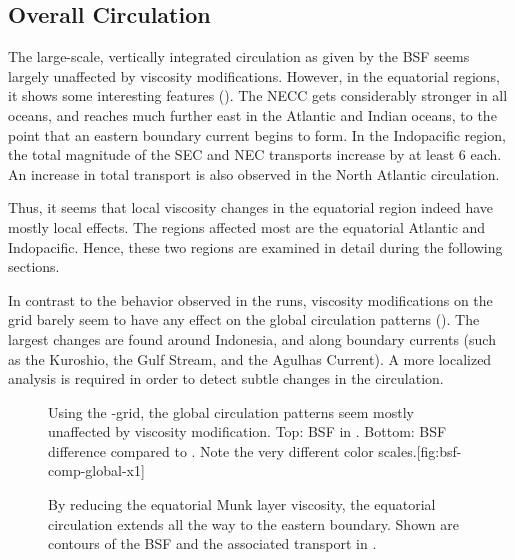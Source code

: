 \subsection{Overall Circulation}
\label{sec:obs-global}
The large-scale, vertically integrated circulation as given by the \ac{BSF} seems largely unaffected by viscosity modifications. However, in the equatorial regions, it shows some interesting features (). The \ac{NECC} gets considerably stronger in all oceans, and reaches much further east in the Atlantic and Indian oceans, to the point that an eastern boundary current begins to form. In the Indopacific region, the total magnitude of the \ac{SEC} and \ac{NEC} transports increase by at least \SI{6}{\sv} each. An increase in total transport is also observed in the North Atlantic circulation.

Thus, it seems that local viscosity changes in the equatorial region indeed have mostly local effects. The regions affected most are the equatorial Atlantic and Indopacific. Hence, these two regions are examined in detail during the following sections.

In contrast to the behavior observed in the  runs, viscosity modifications on the  grid barely seem to have any effect on the global circulation patterns (). The largest changes are found around Indonesia, and along boundary currents (such as the Kuroshio, the Gulf Stream, and the Agulhas Current). A more localized analysis is required in order to detect subtle changes in the circulation.

\begin{figure}[bp]
	\begin{sidecaption}{Using the -grid, the global circulation patterns seem mostly unaffected by viscosity modification. Top: \ac{BSF} in . Bottom: \ac{BSF} difference compared to . Note the very different color scales.}[fig:bsf-comp-global-x1]
		\antimpjustification
	\end{sidecaption}
\end{figure}

\begin{figure}
	\begin{whole}
	\end{whole}
	\caption[Global \acp{BSF} for the -runs.]{By reducing the equatorial Munk layer viscosity, the equatorial circulation extends all the way to the eastern boundary. Shown are contours of the \ac{BSF} and the associated transport in \si{\sv}.}
	\label{fig:bsf-comp-global-x3}
\end{figure}

